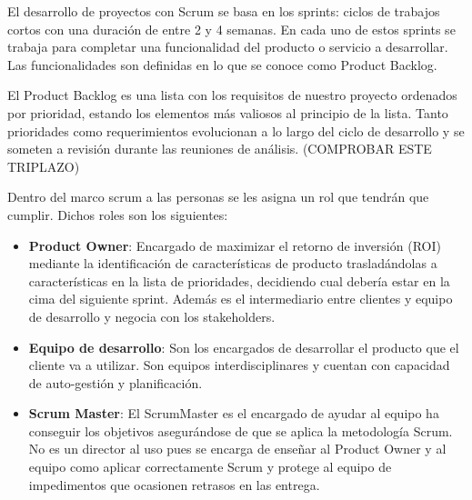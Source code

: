 El desarrollo de proyectos con Scrum se basa en los sprints: ciclos de trabajos cortos con una duración de entre 2 y 4 semanas. En cada uno de estos sprints se trabaja para completar una funcionalidad del producto o servicio a desarrollar. Las funcionalidades son definidas en lo que se conoce como Product Backlog.  

El Product Backlog es una lista con los requisitos de nuestro proyecto ordenados por prioridad, estando los elementos más valiosos al principio de la lista. Tanto prioridades como requerimientos evolucionan a lo largo del ciclo de desarrollo y se someten a revisión durante las reuniones de análisis. (COMPROBAR ESTE TRIPLAZO)

Dentro del marco scrum a las personas se les asigna un rol que tendrán que cumplir. Dichos roles son los siguientes: 
\begin{itemize}
    \item \textbf{Product Owner}: Encargado de maximizar el retorno de inversión (ROI) mediante la identificación de características de producto trasladándolas a características en la lista de prioridades, decidiendo cual debería estar en la cima del siguiente sprint. Además es el intermediario entre clientes y equipo de desarrollo y negocia con los stakeholders.
    \item \textbf{Equipo de desarrollo}: Son los encargados de desarrollar el producto que el cliente va a utilizar. Son equipos interdisciplinares y cuentan con capacidad de auto-gestión y planificación.
    \item \textbf{Scrum Master}: El ScrumMaster es el encargado de ayudar al equipo ha conseguir los objetivos asegurándose de que se aplica la metodología Scrum. No es un director al uso pues se encarga de enseñar al Product Owner y al equipo como aplicar correctamente Scrum y protege al equipo de impedimentos que ocasionen retrasos en las entrega.
\end{itemize}

